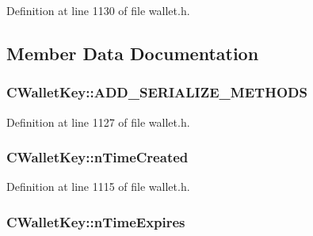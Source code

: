 Definition at line 1130 of file wallet.\+h.



\subsection{Member Data Documentation}
\hypertarget{class_c_wallet_key_a1ad8fb86fc19f29db785a471d772ed3b}{}
\subsubsection[{A\+D\+D\+\_\+\+S\+E\+R\+I\+A\+L\+I\+Z\+E\+\_\+\+M\+E\+T\+H\+O\+D\+S}]{\setlength{\rightskip}{0pt plus 5cm}C\+Wallet\+Key\+::\+A\+D\+D\+\_\+\+S\+E\+R\+I\+A\+L\+I\+Z\+E\+\_\+\+M\+E\+T\+H\+O\+D\+S}\label{class_c_wallet_key_a1ad8fb86fc19f29db785a471d772ed3b}


Definition at line 1127 of file wallet.\+h.

\hypertarget{class_c_wallet_key_a08e4bb5bbb690f478e3f464fdc6f26c2}{}
\subsubsection[{n\+Time\+Created}]{ C\+Wallet\+Key\+::n\+Time\+Created}\label{class_c_wallet_key_a08e4bb5bbb690f478e3f464fdc6f26c2}


Definition at line 1115 of file wallet.\+h.

\hypertarget{class_c_wallet_key_a53b6c0e78341dae728724a35dc88e258}{}
\subsubsection[{n\+Time\+Expires}]{ C\+Wallet\+Key\+::n\+Time\+Expires}\label{class_c_wallet_key_a53b6c0e78341dae728724a35dc88e258}


